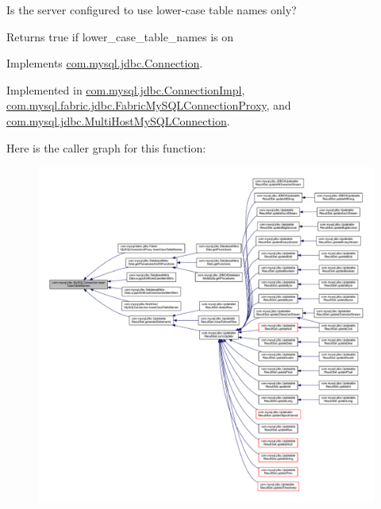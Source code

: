 Is the server configured to use lower-\/case table names only?

\begin{DoxyReturn}{Returns}
true if lower\+\_\+case\+\_\+table\+\_\+names is \textquotesingle{}on\textquotesingle{} 
\end{DoxyReturn}


Implements \mbox{\hyperlink{interfacecom_1_1mysql_1_1jdbc_1_1_connection_a18c9cf0dc2d7ca1f69a3435eb4dbfde2}{com.\+mysql.\+jdbc.\+Connection}}.



Implemented in \mbox{\hyperlink{classcom_1_1mysql_1_1jdbc_1_1_connection_impl_a50a7db180dd968c196dfd94f2bb476fb}{com.\+mysql.\+jdbc.\+Connection\+Impl}}, \mbox{\hyperlink{classcom_1_1mysql_1_1fabric_1_1jdbc_1_1_fabric_my_s_q_l_connection_proxy_a422ca39e48b5e586ff207190c6793193}{com.\+mysql.\+fabric.\+jdbc.\+Fabric\+My\+S\+Q\+L\+Connection\+Proxy}}, and \mbox{\hyperlink{classcom_1_1mysql_1_1jdbc_1_1_multi_host_my_s_q_l_connection_a0d35ab03e1820d4895d11f35d7b9a9ac}{com.\+mysql.\+jdbc.\+Multi\+Host\+My\+S\+Q\+L\+Connection}}.

Here is the caller graph for this function\+:
\nopagebreak
\begin{figure}[H]
\begin{center}
\leavevmode
\includegraphics[width=350pt]{interfacecom_1_1mysql_1_1jdbc_1_1_my_s_q_l_connection_a5b25c6fb6c56e77ebc6989179da0dd75_icgraph}
\end{center}
\end{figure}
\mbox{\label{interfacecom_1_1mysql_1_1jdbc_1_1_my_s_q_l_connection_ab6fa367972e51a54bc186f7856568098}} 
